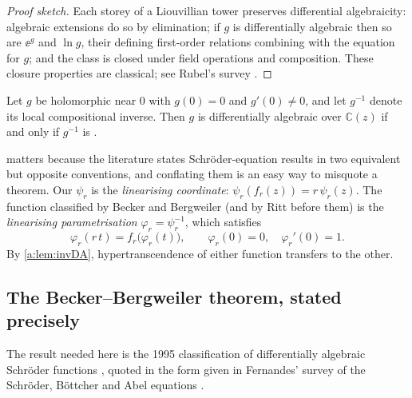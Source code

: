 \begin{proof}[Proof sketch]
Each storey of a Liouvillian tower preserves differential algebraicity: algebraic
extensions do so by elimination; if $g$ is differentially algebraic then so are
$\ee^{g}$ and $\ln g$, their defining first-order relations combining with the
equation for $g$; and the class is closed under field operations and composition.
These closure properties are classical; see Rubel's survey \cite{Rubel1989}.
\end{proof}

\begin{lemma}
\label{a:lem:invDA}
Let $g$ be holomorphic near $0$ with $g(0)=0$ and $g'(0)\neq0$, and let $g^{-1}$
denote its local compositional inverse. Then $g$ is differentially algebraic over
$\mathbb{C}(z)$ if and only if $g^{-1}$ is
\cite{Moore1896,BoshernitzanRubel1986}.
\end{lemma}

 matters because the literature states Schr\"oder-equation
results in two equivalent but opposite conventions, and conflating them is an easy
way to misquote a theorem. Our $\psi_r$ is the \emph{linearising coordinate}:
$\psi_r(f_r(z))=r\,\psi_r(z)$. The function classified by Becker and Bergweiler
(and by Ritt before them) is the \emph{linearising parametrisation}
$\varphi_r=\psi_r^{-1}$, which satisfies
\begin{equation}
\label{a:eq:schroderparam}
\varphi_r(r\,t)=f_r\bigl(\varphi_r(t)\bigr),
\qquad
\varphi_r(0)=0,\quad \varphi_r'(0)=1 .
\end{equation}
By \cref{a:lem:invDA}, hypertranscendence of either function transfers to the
other.

\subsection{The Becker--Bergweiler theorem, stated precisely}
\label{a:sec:BB}

The result needed here is the 1995 classification of differentially algebraic
Schr\"oder functions \cite{Becker1995}, quoted in the form given in Fernandes'
survey of the Schr\"oder, B\"ottcher and Abel equations \cite[Thm~3.1]{Fernandes2021}.

